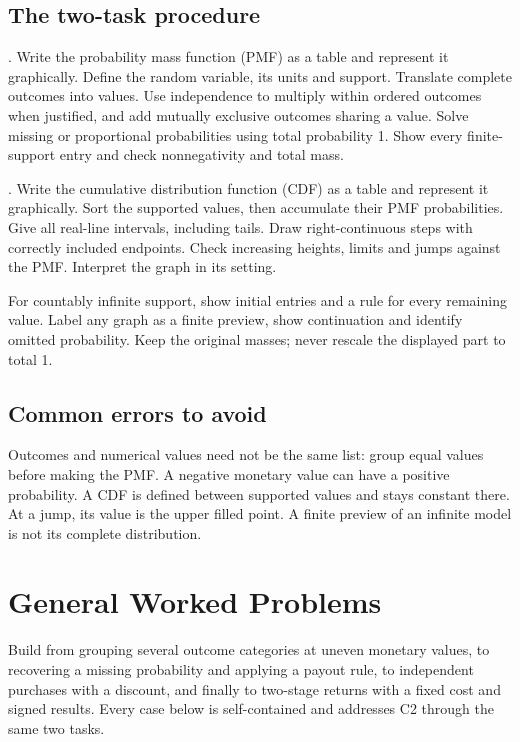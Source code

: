 \subsection{The two-task procedure}
. Write the probability mass function (PMF) as a table and represent it graphically. Define the random variable, its units and support. Translate complete outcomes into values. Use independence to multiply within ordered outcomes when justified, and add mutually exclusive outcomes sharing a value. Solve missing or proportional probabilities using total probability 1. Show every finite-support entry and check nonnegativity and total mass.

. Write the cumulative distribution function (CDF) as a table and represent it graphically. Sort the supported values, then accumulate their PMF probabilities. Give all real-line intervals, including tails. Draw right-continuous steps with correctly included endpoints. Check increasing heights, limits and jumps against the PMF. Interpret the graph in its setting.

For countably infinite support, show initial entries and a rule for every remaining value. Label any graph as a finite preview, show continuation and identify omitted probability. Keep the original masses; never rescale the displayed part to total 1.
\subsection{Common errors to avoid}
Outcomes and numerical values need not be the same list: group equal values before making the PMF. A negative monetary value can have a positive probability. A CDF is defined between supported values and stays constant there. At a jump, its value is the upper filled point. A finite preview of an infinite model is not its complete distribution.
\secInicio
\clearpage
\section{General Worked Problems}\label{sec:general}
Build from grouping several outcome categories at uneven monetary values, to recovering a missing probability and applying a payout rule, to independent purchases with a discount, and finally to two-stage returns with a fixed cost and signed results. Every case below is self-contained and addresses C2 through the same two tasks.

